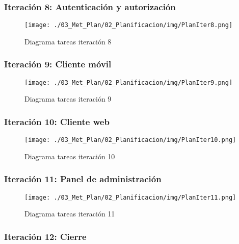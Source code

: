 \subsubsection*{Iteración 8: Autenticación y autorización}

\begin{figure}[H]
\vspace{-1cm}
\texttt{[image: ./03\_Met\_Plan/02\_Planificacion/img/PlanIter8.png]}
\caption{Diagrama tareas iteración 8}
\end{figure}


\subsubsection*{Iteración 9: Cliente móvil}

\begin{figure}[H]
\vspace{-1cm}
\texttt{[image: ./03\_Met\_Plan/02\_Planificacion/img/PlanIter9.png]}
\caption{Diagrama tareas iteración 9}
\end{figure}


\subsubsection*{Iteración 10: Cliente web}

\begin{figure}[H]
\vspace{-1cm}
\texttt{[image: ./03\_Met\_Plan/02\_Planificacion/img/PlanIter10.png]}
\caption{Diagrama tareas iteración 10}
\end{figure}


\subsubsection*{Iteración 11: Panel de administración}

\begin{figure}[H]
\vspace{-1cm}
\texttt{[image: ./03\_Met\_Plan/02\_Planificacion/img/PlanIter11.png]}
\caption{Diagrama tareas iteración 11}
\end{figure}


\subsubsection*{Iteración 12: Cierre}

